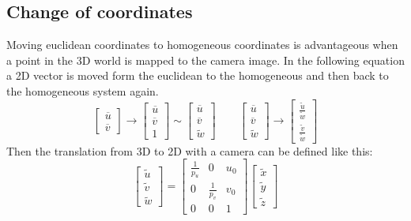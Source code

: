\subsection{Change of coordinates}%
\label{sub:motod:changeofocd}
Moving euclidean coordinates to homogeneous coordinates is advantageous when a point in the 3D world is mapped to the camera image.
In the following equation a 2D vector is moved form the euclidean to the homogeneous and then back to the homogeneous system again.
\begin{equation}
    \begin{bmatrix}
        \overline{u}\\ \overline{v}
    \end{bmatrix}
    \rightarrow
    \begin{bmatrix}
        \overline{u}\\ \overline{v} \\ 1
    \end{bmatrix} \sim
    \begin{bmatrix}
        \overline{u}\\ \overline{v} \\ \tilde w
    \end{bmatrix}\qquad
    \begin{bmatrix}
        \overline{u}\\ \overline{v} \\ \tilde w
    \end{bmatrix}
    \rightarrow
    \begin{bmatrix}
        \frac{\tilde u}{\tilde w}\\
        \frac{\tilde v}{\tilde w}
    \end{bmatrix}
\end{equation}
Then the translation from 3D to 2D with a camera can be defined like this:
\begin{equation}
    \begin{bmatrix}
        \tilde u \\ \tilde v \\ \tilde w
    \end{bmatrix}
    =
    \begin{bmatrix}
        \frac{1}{p_u} & 0 & u_0\\
        0 & \frac{1}{p_v} & v_0\\
        0 & 0 & 1
    \end{bmatrix}
    \begin{bmatrix}
        \tilde x\\ \tilde y\\ \tilde z
    \end{bmatrix}
\end{equation}
